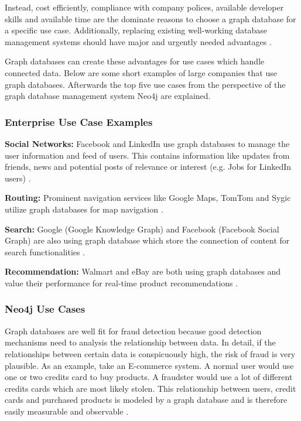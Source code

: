 Instead, cost efficiently, compliance with company polices, available developer skills and available time are the dominate reasons to choose a graph database for a specific use case. Additionally, replacing existing well-working database management systems should have major and urgently needed advantages \autocite{graphdb2015}.

Graph databases can create these advantages for use cases which handle connected data. Below are some short examples of large companies that use graph databases. Afterwards the top five use cases from the perspective of the graph database management system Neo4j are explained.

\subsubsection{Enterprise Use Case Examples}
\textbf{Social Networks:} Facebook and LinkedIn use graph databases to manage the user information and feed of users. This contains information like updates from friends, news and potential posts of relevance or interest (e.g. Jobs for LinkedIn users) \autocite{maheshlal2015}.

\textbf{Routing:} Prominent navigation services like Google Maps, TomTom and Sygic utilize graph databases for map navigation \autocite{maheshlal2015}.

\textbf{Search:} Google (Google Knowledge Graph) and Facebook (Facebook Social Graph) are also using graph database which store the connection of content for search functionalities \autocite{maheshlal2015}.

\textbf{Recommendation:} Walmart and eBay are both using graph databases and value their performance for real-time product recommendations \autocite{neo4j:use_cases}.

\subsubsection{Neo4j Use Cases}

Graph databases are well fit for fraud detection because good detection mechanisms need to analysis the relationship between data. In detail, if the relationships between certain data is conspicuously high, the risk of fraud is very plausible.  As an example, take an E-commerce system. A normal user would use one or two credits card to buy products. A fraudster would use a lot of different credits cards which are most likely stolen. This relationship between users, credit cards and purchased products is modeled by a graph database and is therefore easily measurable and observable \autocite{neo4j:use_cases}.


